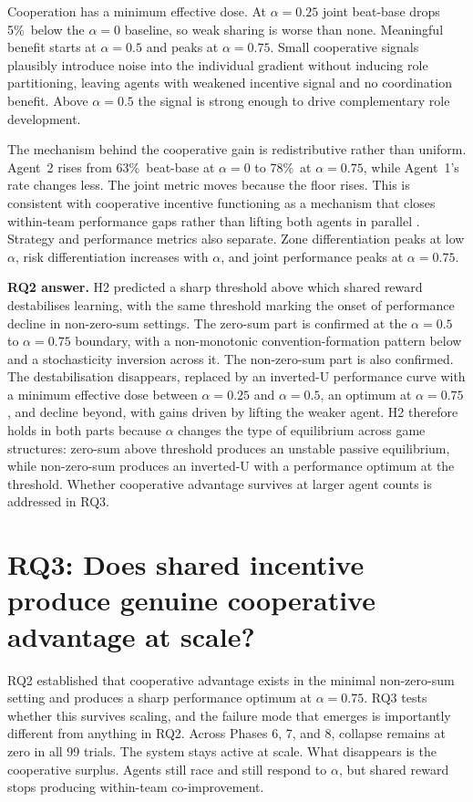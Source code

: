 Cooperation has a minimum effective dose. At $\alpha = 0.25$ joint beat-base drops 5\%\ below the $\alpha = 0$ baseline, so weak sharing is worse than none. Meaningful benefit starts at $\alpha = 0.5$ and peaks at $\alpha = 0.75$. Small cooperative signals plausibly introduce noise into the individual gradient without inducing role partitioning, leaving agents with weakened incentive signal and no coordination benefit. Above $\alpha = 0.5$ the signal is strong enough to drive complementary role development.

The mechanism behind the cooperative gain is redistributive rather than uniform. Agent~2 rises from 63\%\ beat-base at $\alpha = 0$ to 78\%\ at $\alpha = 0.75$, while Agent~1's rate changes less. The joint metric moves because the floor rises. This is consistent with cooperative incentive functioning as a mechanism that closes within-team performance gaps rather than lifting both agents in parallel \citep{hughes2018inequity}. Strategy and performance metrics also separate. Zone differentiation peaks at low $\alpha$, risk differentiation increases with $\alpha$, and joint performance peaks at $\alpha = 0.75$.

\textbf{RQ2 answer.} H2 predicted a sharp threshold above which shared reward destabilises learning, with the same threshold marking the onset of performance decline in non-zero-sum settings. The zero-sum part is confirmed at the $\alpha = 0.5$ to $\alpha = 0.75$ boundary, with a non-monotonic convention-formation pattern below and a stochasticity inversion across it. The non-zero-sum part is also confirmed. The destabilisation disappears, replaced by an inverted-U performance curve with a minimum effective dose between $\alpha = 0.25$ and $\alpha = 0.5$, an optimum at $\alpha = 0.75$, and decline beyond, with gains driven by lifting the weaker agent. H2 therefore holds in both parts because $\alpha$ changes the type of equilibrium across game structures: zero-sum above threshold produces an unstable passive equilibrium, while non-zero-sum produces an inverted-U with a performance optimum at the threshold. Whether cooperative advantage survives at larger agent counts is addressed in RQ3.
\section{RQ3: Does shared incentive produce genuine cooperative advantage at scale?}
\label{sec:rq3}

RQ2 established that cooperative advantage exists in the minimal non-zero-sum setting and produces a sharp performance optimum at $\alpha = 0.75$. RQ3 tests whether this survives scaling, and the failure mode that emerges is importantly different from anything in RQ2. Across Phases 6, 7, and 8, collapse remains at zero in all 99 trials. The system stays active at scale. What disappears is the cooperative surplus. Agents still race and still respond to $\alpha$, but shared reward stops producing within-team co-improvement.

